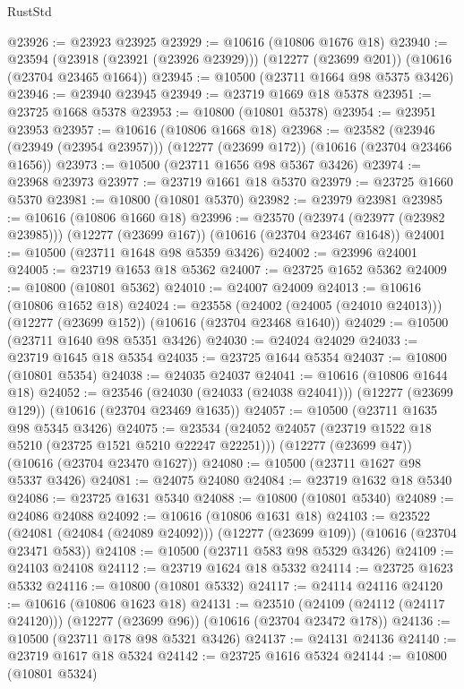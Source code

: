 \begin{lexlean}{RustStd}
\begin{coremodule}
@23926 := @23923 @23925
@23929 := @10616 (@10806 @1676 @18)
@23940 := @23594
    (@23918 (@23921 (@23926 @23929)))
    (@12277 (@23699 @201))
    (@10616 (@23704 @23465 @1664))
@23945 := @10500 (@23711 @1664 @98 @5375 @3426)
@23946 := @23940 @23945
@23949 := @23719 @1669 @18 @5378
@23951 := @23725 @1668 @5378
@23953 := @10800 (@10801 @5378)
@23954 := @23951 @23953
@23957 := @10616 (@10806 @1668 @18)
@23968 := @23582
    (@23946 (@23949 (@23954 @23957)))
    (@12277 (@23699 @172))
    (@10616 (@23704 @23466 @1656))
@23973 := @10500 (@23711 @1656 @98 @5367 @3426)
@23974 := @23968 @23973
@23977 := @23719 @1661 @18 @5370
@23979 := @23725 @1660 @5370
@23981 := @10800 (@10801 @5370)
@23982 := @23979 @23981
@23985 := @10616 (@10806 @1660 @18)
@23996 := @23570
    (@23974 (@23977 (@23982 @23985)))
    (@12277 (@23699 @167))
    (@10616 (@23704 @23467 @1648))
@24001 := @10500 (@23711 @1648 @98 @5359 @3426)
@24002 := @23996 @24001
@24005 := @23719 @1653 @18 @5362
@24007 := @23725 @1652 @5362
@24009 := @10800 (@10801 @5362)
@24010 := @24007 @24009
@24013 := @10616 (@10806 @1652 @18)
@24024 := @23558
    (@24002 (@24005 (@24010 @24013)))
    (@12277 (@23699 @152))
    (@10616 (@23704 @23468 @1640))
@24029 := @10500 (@23711 @1640 @98 @5351 @3426)
@24030 := @24024 @24029
@24033 := @23719 @1645 @18 @5354
@24035 := @23725 @1644 @5354
@24037 := @10800 (@10801 @5354)
@24038 := @24035 @24037
@24041 := @10616 (@10806 @1644 @18)
@24052 := @23546
    (@24030 (@24033 (@24038 @24041)))
    (@12277 (@23699 @129))
    (@10616 (@23704 @23469 @1635))
@24057 := @10500 (@23711 @1635 @98 @5345 @3426)
@24075 := @23534
    (@24052 @24057 (@23719 @1522 @18 @5210 (@23725 @1521 @5210 @22247 @22251)))
    (@12277 (@23699 @47))
    (@10616 (@23704 @23470 @1627))
@24080 := @10500 (@23711 @1627 @98 @5337 @3426)
@24081 := @24075 @24080
@24084 := @23719 @1632 @18 @5340
@24086 := @23725 @1631 @5340
@24088 := @10800 (@10801 @5340)
@24089 := @24086 @24088
@24092 := @10616 (@10806 @1631 @18)
@24103 := @23522
    (@24081 (@24084 (@24089 @24092)))
    (@12277 (@23699 @109))
    (@10616 (@23704 @23471 @583))
@24108 := @10500 (@23711 @583 @98 @5329 @3426)
@24109 := @24103 @24108
@24112 := @23719 @1624 @18 @5332
@24114 := @23725 @1623 @5332
@24116 := @10800 (@10801 @5332)
@24117 := @24114 @24116
@24120 := @10616 (@10806 @1623 @18)
@24131 := @23510
    (@24109 (@24112 (@24117 @24120)))
    (@12277 (@23699 @96))
    (@10616 (@23704 @23472 @178))
@24136 := @10500 (@23711 @178 @98 @5321 @3426)
@24137 := @24131 @24136
@24140 := @23719 @1617 @18 @5324
@24142 := @23725 @1616 @5324
@24144 := @10800 (@10801 @5324)

\end{coremodule}
\end{lexlean}
